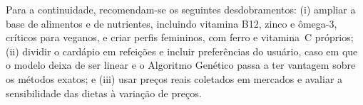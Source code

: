 \documentclass[12pt]{article}
\begin{document}
Para a continuidade, recomendam-se os seguintes desdobramentos: (i) ampliar a base de
alimentos e de nutrientes, incluindo vitamina B12, zinco e ômega-3, críticos para
veganos, e criar perfis femininos, com ferro e vitamina~C próprios; (ii) dividir o cardápio em refeições e
incluir preferências do usuário, caso em que o modelo deixa de ser linear e o
Algoritmo Genético passa a ter vantagem sobre os métodos exatos; e (iii) usar preços
reais coletados em mercados e avaliar a sensibilidade das dietas à variação de preços.



\end{document}
